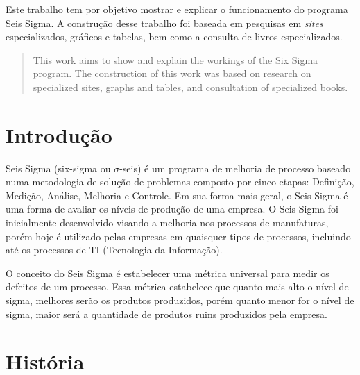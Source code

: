\documentclass{abnt}
\begin{document}
	\capa
	
	\folhaderosto
	
	\begin{resumo}
		Este trabalho tem por objetivo mostrar e explicar o funcionamento do programa Seis Sigma. A construção 
		desse trabalho foi baseada em pesquisas em \textit{sites} especializados, gráficos e tabelas, bem como a consulta 
		de livros especializados.
	\end{resumo}

	\begin{abstract}
			This work aims to show and explain the workings of the Six Sigma program. The construction of this work 
			was based on research on specialized sites, graphs and tables, and consultation of specialized books.
	\end{abstract}
	
	\sumario
	
	\listadetabelas
	
	\listadefiguras
	
	\chapter {Introdução}
	
	Seis Sigma (six-sigma ou $\sigma$-seis) é um programa de melhoria de processo baseado numa 
	metodologia de solução de problemas composto por cinco etapas: Definição, Medição, Análise, 
	Melhoria e Controle. Em sua forma mais geral, o Seis Sigma é uma forma de avaliar os níveis 
	de produção de uma empresa. O Seis Sigma foi inicialmente desenvolvido visando a melhoria nos 
	processos de manufaturas, porém hoje é utilizado pelas empresas em quaisquer tipos de processos, 
	incluindo até os processos de TI (Tecnologia da Informação).
	
	O conceito do Seis Sigma é estabelecer uma métrica universal para medir os defeitos de um processo. 
	Essa métrica estabelece que quanto mais alto o nível de sigma, melhores serão os produtos produzidos, 
	porém quanto menor for o nível de sigma, maior será a quantidade de produtos ruins produzidos pela empresa.
	
	\chapter {História}
	
\end{document}
